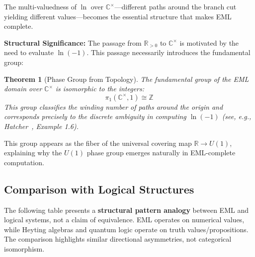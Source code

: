 \documentclass[11pt]{article}
\newtheorem{theorem}{Theorem}[section]
\begin{document}
The multi-valuedness of \(\ln\) over \(\mathbb{C}^\times\)---different paths around the branch cut yielding different values---becomes the essential structure that makes EML complete.

\textbf{Structural Significance:} The passage from \(\mathbb{R}_{>0}\) to \(\mathbb{C}^\times\) is motivated by the need to evaluate \(\ln(-1)\). This passage necessarily introduces the fundamental group:

\begin{theorem}[Phase Group from Topology]\label{thm:phase-group}
The fundamental group of the EML domain over \(\mathbb{C}^\times\) is isomorphic to the integers:
\[\pi_1(\mathbb{C}^\times, 1) \cong \mathbb{Z}\]
This group classifies the winding number of paths around the origin and corresponds precisely to the discrete ambiguity in computing \(\ln(-1)\) \emph{(see, e.g., Hatcher~\cite{Hatcher02}, Example 1.6)}.
\end{theorem}

This group appears as the fiber of the universal covering map \(\mathbb{R} \to U(1)\), explaining why the \(U(1)\) phase group emerges naturally in EML-complete computation.

\subsection{Comparison with Logical Structures}
\label{comparison-with-logical-structures}

The following table presents a \textbf{structural pattern analogy} between EML and logical systems, not a claim of equivalence. EML operates on numerical values, while Heyting algebras and quantum logic operate on truth values/propositions. The comparison highlights similar directional asymmetries, not categorical isomorphism.
\end{document}
